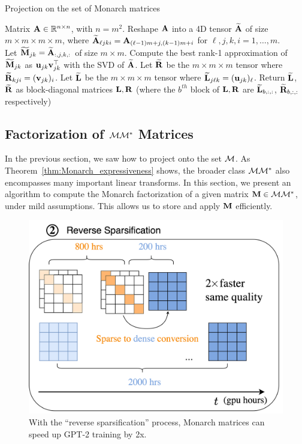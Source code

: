 \begin{algorithm}[H]
  \caption{\label{alg:project}Projection on the set of Monarch matrices}
  \begin{algorithmic}
    \REQUIRE Matrix $\mathbf{A} \in \mathbb{R}^{n \times n}$, with $n = m^2$.
    \STATE Reshape $\mathbf{A}$ into a 4D tensor $\widetilde{\mathbf{A}}$ of size $m \times m \times m \times m$, where
    $\widetilde{\mathbf{A}}_{\ell jki} = \mathbf{A}_{(\ell - 1) m + j, (k-1)m + i}$ for $\ell, j, k, i = 1, \dots, m$.\\
    \STATE Let $\widetilde{\mathbf{M}}_{jk} = \widetilde{\mathbf{A}}_{:, j, k, :}$ of size $m \times m$.
    \STATE Compute the best rank-1 approximation of $\widetilde{\mathbf{M}}_{jk}$ as $\mathbf{u}_{jk} \mathbf{v}_{jk}^\top$ with the SVD of $\widetilde{\mathbf{A}}$.
    \ENDFOR
    \STATE Let $\widetilde{\mathbf{R}}$ be the $m \times m \times m$ tensor where $\widetilde{\mathbf{R}}_{kji} = (\mathbf{v}_{jk})_i$.
    \STATE Let $\widetilde{\mathbf{L}}$ be the $m \times m \times m$ tensor where $\widetilde{\mathbf{L}}_{j \ell k} = (\mathbf{u}_{jk})_\ell$.
    \STATE Return $\widetilde{\mathbf{L}}$, $\widetilde{\mathbf{R}}$ as block-diagonal matrices $\mathbf{L}, \mathbf{R}$ (where the $b^{th}$ block of $\mathbf{L},\mathbf{R}$ are $\widetilde{\mathbf{L}}_{b,:,:}$, $\widetilde{\mathbf{R}}_{b,:,:}$ respectively)
  \end{algorithmic}
\end{algorithm}

\subsection{Factorization of $\mathcal{M}\mathcal{M}^*$ Matrices}
\label{subsec:recovery}
In the previous section, we saw how to project onto the set $\mathcal{M}$.
As Theorem~\ref{thm:Monarch_expressiveness} shows, the broader class $\mathcal{M}\mathcal{M}^*$ also encompasses many important linear transforms.
In this section, we present an algorithm to compute the Monarch factorization of a given matrix $\mathbf{M} \in \mathcal{M}\mathcal{M}^*$, under mild assumptions.
This allows us to store and apply $\mathbf{M}$ efficiently.



\begin{figure}[t]
  \centering
  \includegraphics[width=.4\textwidth]{figures/Monarch-2.png}
  \vspace{-0.5em}
  \caption{\label{fig:reverse_sparsification}With the ``reverse sparsification'' process, Monarch matrices can speed up GPT-2 training by 2x.}
  \vspace{-0.5em}
\end{figure}



